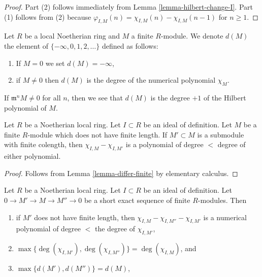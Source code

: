 \begin{proof}
Part (2) follows immediately from Lemma \ref{lemma-hilbert-change-I}.
Part (1) follows from (2) because
$\varphi_{I, M}(n) = \chi_{I, M}(n) - \chi_{I, M}(n - 1)$
for $n \geq 1$.
\end{proof}

\begin{definition}
\label{definition-d}
Let $R$ be a local Noetherian ring and $M$ a finite $R$-module.
We denote {\it $d(M)$} the element of $\{-\infty, 0, 1, 2, \ldots \}$
defined as follows:
\begin{enumerate}
\item If $M = 0$ we set $d(M) = -\infty$,
\item if $M \not = 0$ then $d(M)$ is the degree of the numerical
polynomial $\chi_M$.
\end{enumerate}
\end{definition}

\noindent
If $\mathfrak m^nM \not = 0$ for all $n$, then we see that
$d(M)$ is the degree $+1$ of the Hilbert polynomial of $M$.

\begin{lemma}
\label{lemma-differ-finite-chi}
Let $R$ be a Noetherian local ring. Let $I \subset R$ be an ideal
of definition. Let $M$ be a finite $R$-module
which does not have finite length. If $M' \subset M$ is a submodule
with finite colength, then $\chi_{I, M} - \chi_{I, M'}$
is a polynomial of degree $<$ degree of either polynomial.
\end{lemma}

\begin{proof}
Follows from Lemma \ref{lemma-differ-finite} by elementary calculus.
\end{proof}

\begin{lemma}
\label{lemma-hilbert-ses-chi}
Let $R$ be a Noetherian local ring. Let $I \subset R$ be an ideal of
definition. Let $0 \to M' \to M \to M'' \to 0$ be a short exact sequence
of finite $R$-modules. Then
\begin{enumerate}
\item if $M'$ does not have finite length, then
$\chi_{I, M} - \chi_{I, M''} - \chi_{I, M'}$
is a numerical polynomial of degree $<$ the degree of
$\chi_{I, M'}$,
\item $\max\{ \deg(\chi_{I, M'}), \deg(\chi_{I, M''}) \} = \deg(\chi_{I, M})$,
and
\item $\max\{d(M'), d(M'')\} = d(M)$,
\end{enumerate}
\end{lemma}


